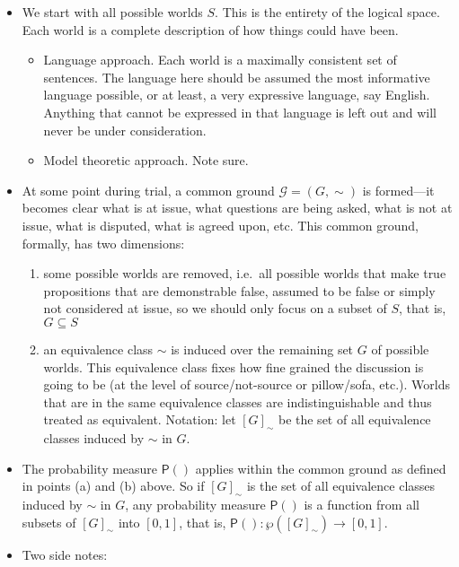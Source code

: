 \documentclass[
  11pt,
  dvipsnames,enabledeprecatedfontcommands]{scrartcl}
\providecommand{\tightlist}{%
  \setlength{\itemsep}{0pt}\setlength{\parskip}{0pt}}
\newcommand{\pr}[1]{\ensuremath{\mathsf{P}(#1)}}
\begin{document}
\begin{itemize}
\item
  We start with all possible worlds \(S\). This is the entirety of the
  logical space. Each world is a complete description of how things
  could have been.

  \begin{itemize}
  \tightlist
  \item
    Language approach. Each world is a maximally consistent set of
    sentences. The language here should be assumed the most informative
    language possible, or at least, a very expressive language, say
    English. Anything that cannot be expressed in that language is left
    out and will never be under consideration.
  \item
    Model theoretic approach. Note sure.
  \end{itemize}
\item
  At some point during trial, a common ground \(\mathcal{G}=(G, \sim)\)
  is formed---it becomes clear what is at issue, what questions are
  being asked, what is not at issue, what is disputed, what is agreed
  upon, etc. This common ground, formally, has two dimensions:

  \begin{enumerate}
  \def\labelenumi{\alph{enumi}.}
  \tightlist
  \item
    some possible worlds are removed, i.e.~all possible worlds that make
    true propositions that are demonstrable false, assumed to be false
    or simply not considered at issue, so we should only focus on a
    subset of \(S\), that is, \(G\subseteq S\)
  \item
    an equivalence class \(\sim\) is induced over the remaining set
    \(G\) of possible worlds. This equivalence class fixes how fine
    grained the discussion is going to be (at the level of
    source/not-source or pillow/sofa, etc.). Worlds that are in the same
    equivalence classes are indistinguishable and thus treated as
    equivalent. Notation: let \([G]_\sim\) be the set of all equivalence
    classes induced by \(\sim\) in \(G\).
  \end{enumerate}
\item
  The probability measure \(\pr{}\) applies within the common ground as
  defined in points (a) and (b) above. So if \([G]_\sim\) is the set of
  all equivalence classes induced by \(\sim\) in \(G\), any probability
  measure \(\pr{}\) is a function from all subsets of \([G]_\sim\) into
  \([0, 1]\), that is, \(\pr{}: \wp([G]_\sim)\to [0,1]\).
\item
  Two side notes:


\end{itemize}
\end{document}
